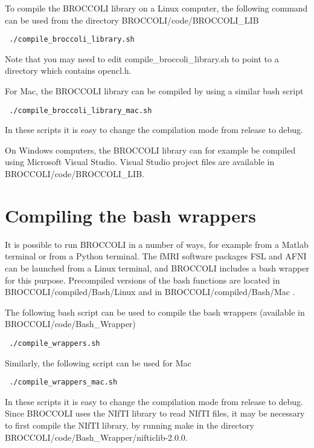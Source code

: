 To compile the BROCCOLI library on a Linux computer, the following command can be used from the directory BROCCOLI/code/BROCCOLI\_LIB 

\begin{verbatim}
 ./compile_broccoli_library.sh 
\end{verbatim}

Note that you may need to edit compile\_broccoli\_library.sh to point to a directory which contains opencl.h. 

For Mac, the BROCCOLI library can be compiled by using a similar bash script

\begin{verbatim}
 ./compile_broccoli_library_mac.sh 
\end{verbatim}

In these scripts it is easy to change the compilation mode from release to debug.

On Windows computers, the BROCCOLI library can for example be compiled using Microsoft Visual Studio. Visual Studio project files are available in BROCCOLI/code/BROCCOLI\_LIB. 

\section{Compiling the bash wrappers}

It is possible to run BROCCOLI in a number of ways, for example from a Matlab terminal or from a Python terminal. The fMRI software packages FSL and AFNI can be launched from a Linux terminal, and BROCCOLI includes a bash wrapper for this purpose. Precompiled versions of the bash functions are located in BROCCOLI/compiled/Bash/Linux and in BROCCOLI/compiled/Bash/Mac .

The following bash script can be used to compile the bash wrappers (available in BROCCOLI/code/Bash\_Wrapper)

\begin{verbatim}
 ./compile_wrappers.sh 
\end{verbatim}

Similarly, the following script can be used for Mac

\begin{verbatim}
 ./compile_wrappers_mac.sh 
\end{verbatim}

In these scripts it is easy to change the compilation mode from release to debug. Since BROCCOLI uses the NIfTI library to read NIfTI files, it may be necessary to first compile the NIfTI library, by running make in the directory BROCCOLI/code/Bash\_Wrapper/nifticlib-2.0.0.

